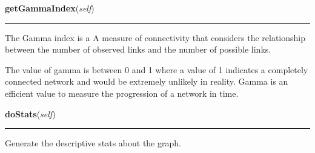     \label{Epigrass:simobj:graph:getGammaIndex}

    \vspace{0.5ex}

    \begin{boxedminipage}{\textwidth}

    \raggedright \textbf{getGammaIndex}(\textit{self})

    \vspace{-1.5ex}

    \rule{\textwidth}{0.5\fboxrule}
    The Gamma index is a A measure of connectivity that considers the 
    relationship between the number of observed links and the number of 
    possible links.

    The value of gamma is between 0 and 1 where a value of 1 indicates a 
    completely connected network and would be extremely unlikely in 
    reality. Gamma is an efficient value to measure the progression of a 
    network in time.

    \vspace{1ex}

    \end{boxedminipage}

    \label{Epigrass:simobj:graph:doStats}

    \vspace{0.5ex}

    \begin{boxedminipage}{\textwidth}

    \raggedright \textbf{doStats}(\textit{self})

    \vspace{-1.5ex}

    \rule{\textwidth}{0.5\fboxrule}
    Generate the descriptive stats about the graph.

    \vspace{1ex}

    \end{boxedminipage}

    \label{Epigrass:simobj:graph:plotDegreeDist}

